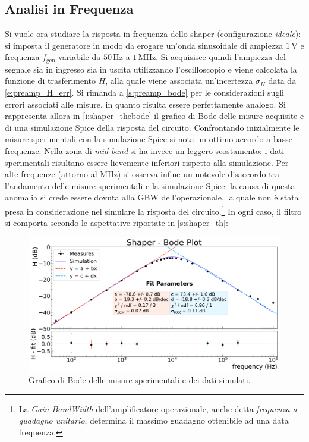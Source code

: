 \documentclass[a4paper,11pt]{article} %
\begin{document}

\subsection{Analisi in Frequenza}\label{s:shaper_bode}

Si vuole ora studiare la risposta in frequenza dello shaper (configurazione \textit{ideale}): si imposta il generatore
in modo da erogare un'onda sinusoidale di ampiezza $1\,\si{\volt}$ e frequenza $f_{\text{gen}}$ variabile da
$50\,\si{\Hz}$ a $1\,\si{\MHz}$. Si acquisisce quindi l'ampiezza del segnale sia in ingresso sia in uscita utilizzando
l'oscilloscopio e viene calcolata la funzione di trasferimento $H$, alla quale viene associata un'incertezza
$\sigma_{H}$ data da \autoref{e:preamp_H_err}. Si rimanda a \autoref{s:preamp_bode} per le considerazioni sugli errori
associati alle misure, in quanto risulta essere perfettamente analogo. Si rappresenta allora in
\autoref{i:shaper_thebode} il grafico di Bode delle misure acquisite e di una simulazione Spice della risposta del
circuito. Confrontando inizialmente le misure sperimentali con la simulazione Spice si nota un ottimo accordo a basse
frequenze. Nella zona di \textit{mid band} si ha invece un leggero scostamento: i dati sperimentali risultano essere
lievemente inferiori rispetto alla simulazione. Per alte frequenze (attorno al MHz) si osserva infine un notevole
disaccordo tra l'andamento delle misure sperimentali e la simulazione Spice: la causa di questa anomalia si crede essere
dovuta alla GBW dell'operazionale, la quale non è stata presa in considerazione nel simulare la risposta del
circuito.\footnote{La \textit{Gain BandWidth} dell'amplificatore operazionale, anche detta \textit{frequenza a guadagno
unitario}, determina il massimo guadagno ottenibile ad una data frequenza.} In ogni caso, il filtro si comporta secondo
le aspettative riportate in \autoref{s:shaper_th}:

\begin{figure}%
	\centering 
	\includegraphics[width=0.8\linewidth]{../Plots/Shaper/bode_plot2.png} 
	\vspace{-10pt}
	\caption{\small Grafico di Bode delle misure sperimentali e dei dati simulati.} 
	\label{i:shaper_thebode} 
\end{figure} 
\end{document}
